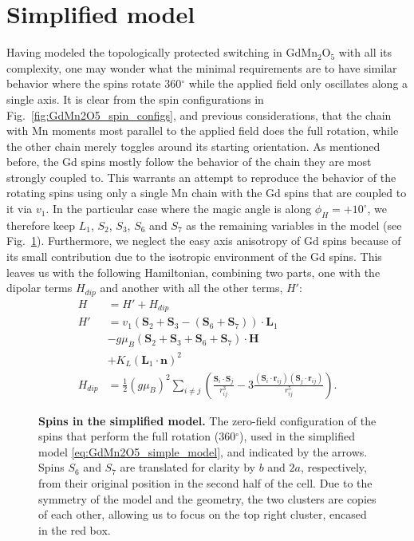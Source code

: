 \section{Simplified model \label{sec:GdMn2O5_simple_model}}
Having modeled the topologically protected switching in  GdMn$_2$O$_5$ with all its complexity, one may wonder what the minimal requirements are to have similar behavior where the spins rotate 360$^\circ$ while the applied field only oscillates along a single axis.
It is clear from the spin configurations in Fig.~\ref{fig:GdMn2O5_spin_configs}, and previous considerations, that the chain with Mn moments most parallel to the applied field does the full rotation, while the other chain merely toggles around its starting orientation. As mentioned before, the Gd spins mostly follow the behavior of the chain they are most strongly coupled to. This warrants an attempt to reproduce the behavior of the rotating spins using only a single Mn chain with the Gd spins that are coupled to it via $v_1$. 
In the particular case where the magic angle is along $\phi_H = +10^\circ$, we therefore keep $L_1$, $S_2$, $S_3$, $S_6$ and $S_7$ as the remaining variables in the model (see Fig.~\ref{fig:GdMn2O5_simple_model}).
Furthermore, we neglect the easy axis anisotropy of Gd spins because of its small contribution due to the isotropic environment of the Gd spins.
This leaves us with the following Hamiltonian, combining two parts, one with the dipolar terms $H_{dip}$ and another with all the other terms, $H'$:
\begin{align}
	\label{eq:GdMn2O5_simple_model}
	H &= H' + H_{dip} \\
	H' &= v_1(\bm{S}_2 + \bm{S}_3 - (\bm{S}_6 + \bm{S}_7))\cdot\bm{L}_1 \nonumber\\
	&- g \mu_B (\bm{S}_2 + \bm{S}_3 + \bm{S}_6 + \bm{S}_7) \cdot \bm{H} \nonumber\\
	&+ K_L (\bm{L}_1 \cdot \bm{n})^2 \nonumber\\
	H_{dip} &= \frac{1}{2}(g \mu_B)^2\sum_{i\neq j}\left(\frac{\bm{S}_i\cdot \bm{S}_j}{r_{ij}^
3}-3\frac{(\bm{S}_i\cdot \bm{r}_{ij})(\bm{S}_j\cdot \bm{r}_{ij})}{r_{ij}^5}\right)\nonumber.
\end{align}
\begin{figure}
	\centering
	\caption{\label{fig:GdMn2O5_simple_model}{\bf Spins in the simplified model.} The zero-field configuration of the spins that perform the full rotation (360$^\circ$), used in the simplified model \eqref{eq:GdMn2O5_simple_model}, and indicated by the arrows. Spins $S_6$ and $S_7$ are translated for clarity by $b$ and $2a$, respectively, from their original position in the second half of the cell. Due to the symmetry of the model and the geometry, the two clusters are copies of each other, allowing us to focus on the top right cluster, encased in the red box.}
\end{figure}
